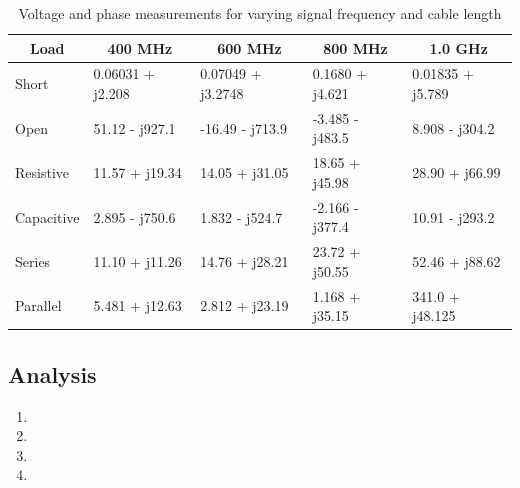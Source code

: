 \documentclass{article}
\begin{document}
\begin{table}[H]
\centering
\begin{tabular}{|l|l|l|l|l|}
\hline
\multicolumn{1}{|c|}{\textbf{Load}} & \multicolumn{1}{c|}{\textbf{400 MHz}} & \multicolumn{1}{c|}{\textbf{600 MHz}} & \multicolumn{1}{c|}{\textbf{800 MHz}} & \multicolumn{1}{c|}{\textbf{1.0 GHz}} \\ \hline
Short                               & 0.06031 + j2.208                      & 0.07049 + j3.2748                     & 0.1680 + j4.621                       & 0.01835 + j5.789                      \\ \hline
Open                                & 51.12 - j927.1                        & -16.49 - j713.9                       & -3.485 - j483.5                       & 8.908 - j304.2                        \\ \hline
Resistive                           & 11.57 + j19.34                        & 14.05 + j31.05                        & 18.65 + j45.98                        & 28.90 + j66.99                        \\ \hline
Capacitive                          & 2.895 - j750.6                        & 1.832 - j524.7                        & -2.166 - j377.4                       & 10.91 - j293.2                        \\ \hline
Series                              & 11.10 + j11.26                        & 14.76 + j28.21                        & 23.72 + j50.55                        & 52.46 + j88.62                        \\ \hline
Parallel                            & 5.481 + j12.63                        & 2.812 + j23.19                        & 1.168 + j35.15                        & 341.0 + j48.125
\\ \hline
\end{tabular}
	\caption{Voltage and phase measurements for varying signal frequency and cable length}
	\label{Data 1}
\end{table}

\subsection{Analysis}

\begin{enumerate}
	\item
	\item
	\item
	\item
\end{enumerate}
\end{document}
